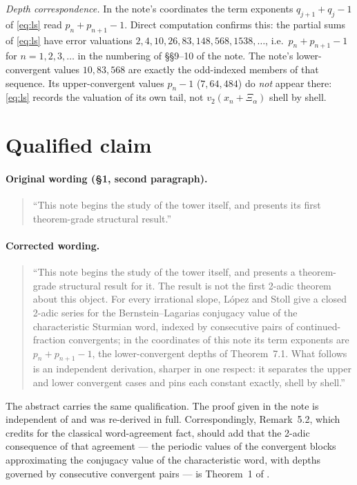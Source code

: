 \documentclass[10pt]{article}
\newcommand{\Xiac}{\Xi_{\alpha}}
\begin{document}
\medskip
\noindent\emph{Depth correspondence.} In the note's coordinates the term exponents
$q_{j+1}+q_j-1$ of \eqref{eq:ls} read $p_n+p_{n+1}-1$. Direct computation confirms this: the
partial sums of \eqref{eq:ls} have error valuations $2,4,10,26,83,148,568,1538,\dots$, i.e.\
$p_n+p_{n+1}-1$ for $n=1,2,3,\dots$ in the numbering of \S\S9--10 of the note. The note's
lower-convergent values $10,83,568$ are exactly the odd-indexed members of that sequence. Its
upper-convergent values $p_n-1$ ($7,64,484$) do \emph{not} appear there: \eqref{eq:ls} records the
valuation of its own tail, not $v_2(x_n+\Xiac)$ shell by shell.

\section{Qualified claim}

\paragraph{Original wording (\S1, second paragraph).}
\begin{quote}
``This note begins the study of the tower itself, and presents its first theorem-grade structural
result.''
\end{quote}

\paragraph{Corrected wording.}
\begin{quote}
``This note begins the study of the tower itself, and presents a theorem-grade structural result
for it. The result is not the first 2-adic theorem about this object. For every irrational slope,
L\'opez and Stoll \cite{lopez2009conjugacy} give a closed 2-adic series for the
Bernstein--Lagarias conjugacy value \cite{bernstein1996conjugacy} of the characteristic Sturmian
word, indexed by consecutive pairs of continued-fraction convergents; in the coordinates of this
note its term exponents are $p_n+p_{n+1}-1$, the lower-convergent depths of Theorem~7.1. What
follows is an independent derivation, sharper in one respect: it separates the upper and lower
convergent cases and pins each constant exactly, shell by shell.''
\end{quote}

\noindent The abstract carries the same qualification. The proof given in the note is independent
of \cite{lopez2009conjugacy} and was re-derived in full. Correspondingly, Remark~5.2, which credits
\cite{lothaire2002algebraic} for the classical word-agreement fact, should add that the 2-adic
consequence of that agreement --- the periodic values of the convergent blocks approximating the
conjugacy value of the characteristic word, with depths governed by consecutive convergent pairs
--- is Theorem~1 of \cite{lopez2009conjugacy}.
\end{document}
